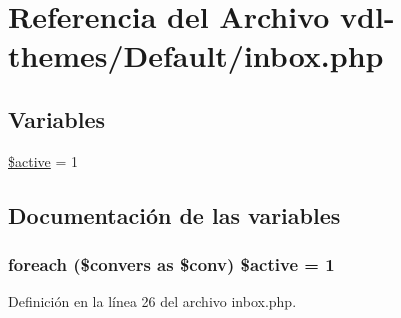 \hypertarget{inbox_8php}{\section{Referencia del Archivo vdl-\/themes/\-Default/inbox.php}
\label{inbox_8php}
}
\subsection*{Variables}
\begin{DoxyCompactItemize}
\item 
\hyperlink{inbox_8php_a6c6e085757b413a98481908f8bf6df13}{\$active} = 1
\end{DoxyCompactItemize}


\subsection{Documentación de las variables}
\hypertarget{inbox_8php_a6c6e085757b413a98481908f8bf6df13}{
\subsubsection[{\$active}]{\setlength{\rightskip}{0pt plus 5cm}foreach (\$convers as \$conv) \$active = 1}}\label{inbox_8php_a6c6e085757b413a98481908f8bf6df13}


Definición en la línea 26 del archivo inbox.\-php.

